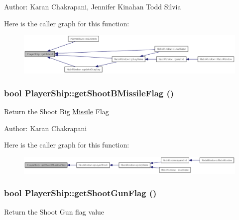 Author: Karan Chakrapani, Jennifer Kinahan Todd Silvia 

Here is the caller graph for this function:\nopagebreak
\begin{figure}[H]
\begin{center}
\leavevmode
\includegraphics[width=408pt]{class_player_ship_a84fda0bb0ef416d7bcf04f4e3a89c181_icgraph}
\end{center}
\end{figure}
\hypertarget{class_player_ship_af05e367beced958cbf5cac5bc67fd3f4}{
\subsubsection[{getShootBMissileFlag}]{\setlength{\rightskip}{0pt plus 5cm}bool PlayerShip::getShootBMissileFlag ()}}
\label{class_player_ship_af05e367beced958cbf5cac5bc67fd3f4}
Return the Shoot Big \hyperlink{class_missile}{Missile} Flag

Author: Karan Chakrapani 

Here is the caller graph for this function:\nopagebreak
\begin{figure}[H]
\begin{center}
\leavevmode
\includegraphics[width=420pt]{class_player_ship_af05e367beced958cbf5cac5bc67fd3f4_icgraph}
\end{center}
\end{figure}
\hypertarget{class_player_ship_ae5bc443b4609f8f0b691425960a9a419}{
\subsubsection[{getShootGunFlag}]{\setlength{\rightskip}{0pt plus 5cm}bool PlayerShip::getShootGunFlag ()}}
\label{class_player_ship_ae5bc443b4609f8f0b691425960a9a419}
Return the Shoot Gun flag value

